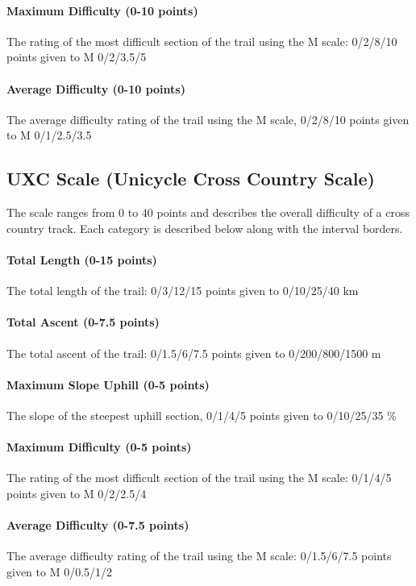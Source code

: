 \documentclass[a4paper,oneside]{scrartcl}
\begin{document}
\paragraph{Maximum Difficulty (0-10 points)}
The rating of the most difficult section of the trail using the M scale:
0/2/8/10 points given to M 0/2/3.5/5

\paragraph{Average Difficulty (0-10 points)}
The average difficulty rating of the trail using the M scale, 0/2/8/10 points
given to M 0/1/2.5/3.5



\subsection{UXC Scale (Unicycle Cross Country Scale)}
\label{sec:uxc-scale}
The scale ranges from 0 to 40 points and describes the overall difficulty of a
cross country track. Each category is described below along with the
interval borders.

\paragraph{Total Length (0-15 points)}
The total length of the trail: 0/3/12/15 points given to 0/10/25/40 km

\paragraph{Total Ascent (0-7.5 points)} 
The total ascent of the trail: 0/1.5/6/7.5 points given to 0/200/800/1500 m

\paragraph{Maximum Slope Uphill (0-5 points)} 
The slope of the steepest uphill section, 0/1/4/5 points given to 0/10/25/35 \%

\paragraph{Maximum Difficulty (0-5 points)}
The rating of the most difficult section of the trail using the M scale: 0/1/4/5
points given to M 0/2/2.5/4

\paragraph{Average Difficulty (0-7.5 points)} 
The average difficulty rating of the trail using the M scale: 0/1.5/6/7.5 points
given to M 0/0.5/1/2
\end{document}
